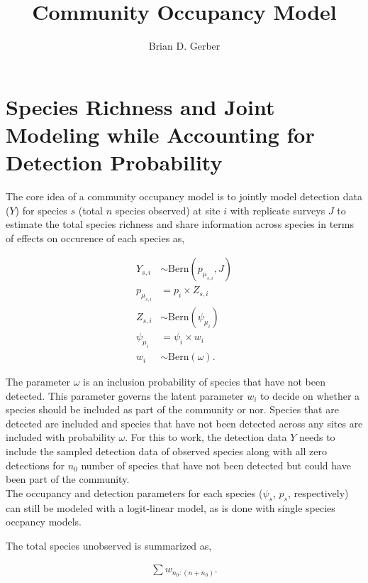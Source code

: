 \documentclass[12pt]{article}
\title{Community Occupancy Model}
\author{Brian D. Gerber}
\begin{document}
\maketitle
\section{Species Richness and Joint Modeling while Accounting for Detection Probability}


The core idea of a community occupancy model is to jointly model detection data ($Y$) for species $s$ (total $n$ species observed) at site $i$ with replicate surveys $J$ to estimate the total species richness and share information across species in terms of effects on occurence of each species as,

\begin{align*}
Y_{s,i} &\sim \text{Bern}(p_{\mu_{s,i}}, J)\\
p_{\mu_{s,i}} &= p_{i}\times Z_{s,i}\\
Z_{s,i} &\sim \text{Bern}(\psi_{\mu_{i}})\\
\psi_{\mu_{i}} &= \psi_{i}\times w_{i}\\
 w_{i} &\sim \text{Bern}(\omega).
\end{align*}


The parameter $\omega$ is an inclusion probability of species that have not been detected. This parameter governs the latent parameter $w_{i}$ to decide on whether a species should be included as part of the community or nor. Species that are detected are included and species that have not been detected across any sites are included with probability $\omega$. For this to work, the detection data $Y$ needs to include the sampled detection data of observed species along with all zero detections for $n_{0}$ number of species that have not been detected but could have been part of the community. \\

The occupancy and detection parameters for each species ($\psi_{s}$, $p_{s}$, respectively) can still be modeled with a logit-linear model, as is done with single species occpancy models. 

The total species unobserved is summarized as,

\begin{align*}
\sum w_{n_{0} : (n+n_{0})}.
\end{align*}
\end{document}
